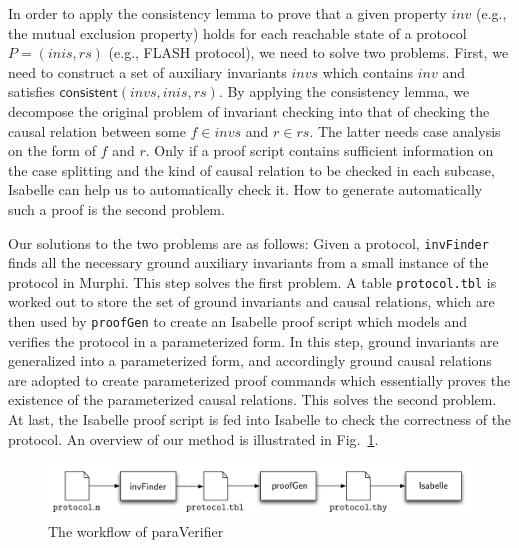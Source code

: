 \documentclass{llncs}
\begin{document}
In order to  apply the consistency lemma to prove that a given property $inv$ (e.g., the mutual exclusion property) holds for each reachable state of a protocol $P=(inis,rs)$ (e.g., FLASH  protocol), we need to solve two problems. First, we need to construct a set of auxiliary invariants $invs$ which contains $inv$ and satisfies  $\mathsf{consistent}( invs, inis, rs)$.  By applying the consistency lemma, we  decompose the original problem of invariant checking into that of checking the causal relation between some $f\in invs$ and $r \in rs$. The latter needs   case analysis on the form of $f$ and $r$.  Only if a proof script contains sufficient information on the case splitting and  the kind of causal relation to be checked in each subcase, Isabelle can help us to automatically  check it. How to  generate automatically such a proof is the second problem.

Our solutions to the two problems are as follows:
Given a protocol,  \texttt{invFinder} finds all the necessary ground auxiliary invariants from a small instance of the protocol in Murphi. This step solves the first  problem.
 A table {\tt protocol.tbl} is worked out  to store the set of ground invariants and
 causal relations, which are then  used by {\tt proofGen} to
create an Isabelle proof   script which models and verifies the
protocol in a parameterized form. In this step, ground invariants
are generalized into a parameterized form, and accordingly
ground causal relations are adopted to create parameterized
proof commands which essentially proves the existence of the
parameterized causal relations. This solves the second problem.  At last, the Isabelle proof script is
fed into Isabelle to check the correctness of the protocol.
An overview of our method is  illustrated in Fig.~\ref{fig:arch}.

\vspace{-10pt}
\begin{figure}[htbp]
\centering %
\includegraphics[width=1\textwidth]{paraVerifier.pdf}
\vspace{-20pt}
\caption{The workflow of {\sf paraVerifier} \label{fig:arch}
}
\end{figure}
\vspace{-20pt}
\end{document}
